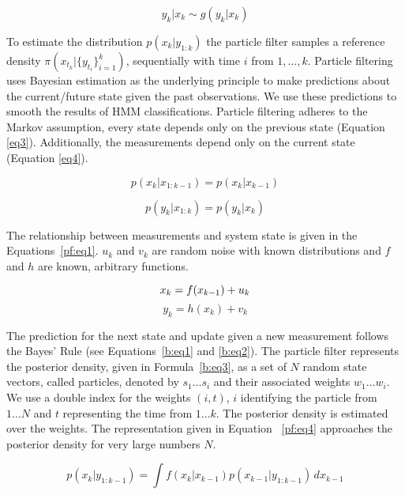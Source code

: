 \begin{equation}
    y_k|x_k \sim g(y_k|x_k)
    \label{eq1}
\end{equation}

To estimate the distribution $p(x_k|y_{1:k})$ the particle filter samples a reference density  $\pi(x_{t_k}|\{y_{t_i}\}^{k}_{i=1})$, sequentially with time $i$ from $1, \ldots, k$.
Particle filtering uses Bayesian estimation as the underlying principle
to make predictions about the current/future state given the past observations.
We use these predictions to smooth the results of HMM classifications.
Particle filtering adheres to the Markov assumption, every state depends only on the previous
state (Equation \ref{eq3}). 
Additionally, the measurements depend only on the current state (Equation \ref{eq4}).

\begin{equation}
p(x_k|x_{1:k-1}) = p(x_k | x_{k-1}) 
\label{eq3}
\end{equation}

\begin{equation}
    p(y_k|x_{1:k}) =p(y_k | x_{k}) 
\label{eq4}
\end{equation}

The relationship between measurements and system state is given in the Equations~\ref{pf:eq1}.
$u_k$ and $v_k$ are random noise with known distributions and 
$f$ and $h$ are known, arbitrary functions.
  
\begin{equation}
    x_k = f(x_{k-1}) + u_k \nonumber\\
\end{equation}
\begin{equation}
    y_k = h(x_k) + v_k 
    \label{pf:eq1}
\end{equation}

The prediction for the next state and update given a new measurement follows
the Bayes' Rule (see Equations~\ref{b:eq1} and \ref{b:eq2}).
The particle filter represents the posterior density, given in Formula~\ref{b:eq3},
as a set of $N$ random state vectors, called particles, denoted by $s_{1} ... s_{i}$ and
their associated weights $w_{1} ... w_{i}$.  We use a double index for the weights 
$(i,t)$, $i$ identifying the particle from $1 \ldots N$ and $t$ representing the time from $1 \ldots k$.
The posterior density is estimated over the weights.
The representation given in Equation ~\ref{pf:eq4} approaches the posterior density for very large numbers $N$.

\begin{equation}
p(x_k|y_{1:k-1}) = \int f(x_k | x_{k-1}) p(x_{k-1} | y_{1:k-1} ) \, dx_{k-1} 
\label{b:eq1}
\end{equation}

